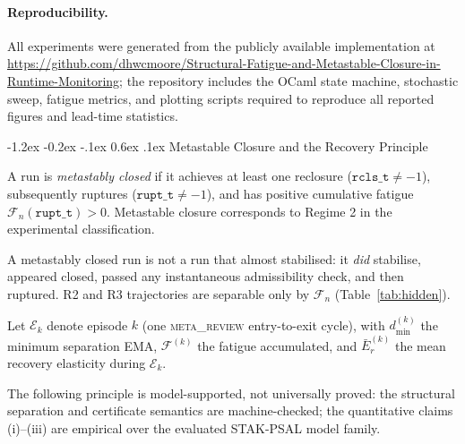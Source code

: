 \documentclass{llncs}
\makeatletter
\renewcommand\section{\@startsection{section}{1}{\z@}%
  {-1.2ex \@plus -0.2ex \@minus -.1ex}%
  {0.6ex \@plus .1ex}%
  {\normalfont\large\bfseries}}
\newcommand{\st}[1]{\textup{\textsc{#1}}}
\makeatother
\begin{document}
\paragraph{Reproducibility.}
All experiments were generated from the publicly available implementation
at \url{https://github.com/dhwcmoore/Structural-Fatigue-and-Metastable-Closure-in-Runtime-Monitoring};
the repository includes the OCaml state machine, stochastic sweep,
fatigue metrics, and plotting scripts required to reproduce all
reported figures and lead-time statistics.

\section{Metastable Closure and the Recovery Principle}
\label{sec:mrp}

\begin{definition}
\label{def:metastable}
A run is \emph{metastably closed} if it achieves at least one reclosure
($\mathtt{rcls\_t} \neq -1$), subsequently ruptures
($\mathtt{rupt\_t} \neq -1$), and has positive cumulative fatigue
$\mathcal{F}_n(\mathtt{rupt\_t}) > 0$. Metastable closure corresponds
to Regime 2 in the experimental classification.
\end{definition}

A metastably closed run is not a run that almost stabilised: it
\emph{did} stabilise, appeared closed, passed any instantaneous
admissibility check, and then ruptured. R2 and R3 trajectories are
separable only by $\mathcal{F}_n$ (Table~\ref{tab:hidden}).

Let $\mathcal{E}_k$ denote episode $k$ (one \st{meta\_review}
entry-to-exit cycle), with $d_{\min}^{(k)}$ the minimum separation EMA,
$\mathcal{F}^{(k)}$ the fatigue accumulated, and $\bar{E}_r^{(k)}$ the
mean recovery elasticity during $\mathcal{E}_k$.

The following principle is model-supported, not universally proved:
the structural separation and certificate semantics are machine-checked;
the quantitative claims (i)--(iii) are empirical over the evaluated
STAK-PSAL model family.
\end{document}
